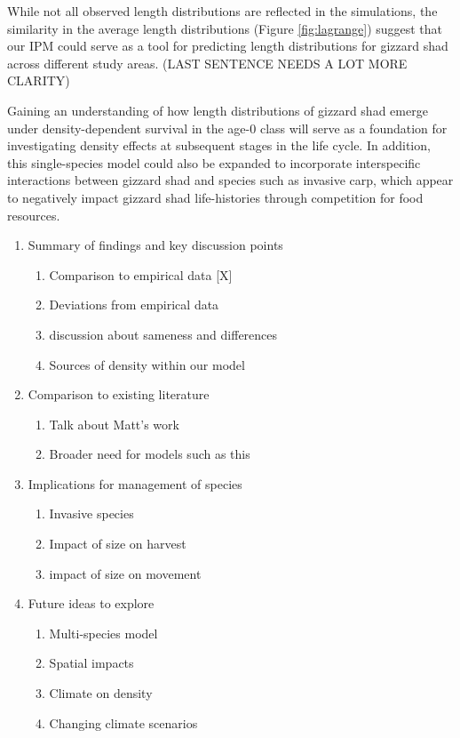 \documentclass[preprint,review,12pt,authoryear]{elsarticle}
\begin{document}
While not all observed length distributions are reflected in the simulations, the similarity in the average length distributions (Figure \ref{fig:lagrange}) suggest that our IPM could serve as a tool for predicting length distributions for gizzard shad across different study areas. (LAST SENTENCE NEEDS A LOT MORE CLARITY)

Gaining an understanding of how length distributions of gizzard shad emerge under density-dependent survival in the age-0 class will serve as a foundation for investigating density effects at subsequent stages in the life cycle.  
In addition, this single-species model could also be expanded to incorporate interspecific interactions between gizzard shad and species such as invasive carp, which appear to negatively impact gizzard shad life-histories through competition for food resources.   

\begin{enumerate}
\item Summary of findings and key discussion points
  \begin{enumerate}
  \item Comparison to empirical data [X]
  \item Deviations from empirical data
  \item discussion about sameness and differences 
  \item Sources of density within our model
  \end{enumerate}
\item Comparison to existing literature
  \begin{enumerate}
  \item Talk about Matt's work \citep{catalano2010size,
      catalano2011whole}
  \item Broader need for models such as this
  \end{enumerate}
\item Implications for management of species
  \begin{enumerate}
  \item Invasive species
  \item Impact of size on harvest
  \item impact of size on movement
  \end{enumerate}
\item Future ideas to explore
  \begin{enumerate}
  \item Multi-species model
  \item Spatial impacts
  \item Climate on density
  \item Changing climate scenarios
  \end{enumerate}
\end{enumerate}
\end{document}
